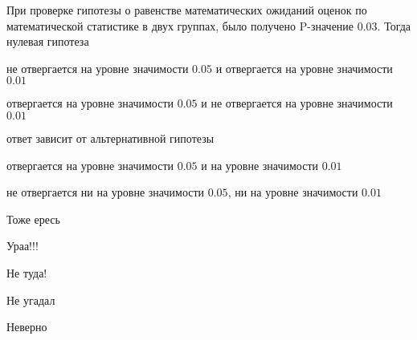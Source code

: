 
\begin{question}
При проверке гипотезы о равенстве математических ожиданий оценок по
математической статистике в двух группах, было получено P-значение 0.03.
Тогда нулевая гипотеза
\begin{answerlist}
  \item не отвергается на уровне значимости \(0.05\) и отвергается на уровне
значимости \(0.01\)
  \item отвергается на уровне значимости \(0.05\) и не отвергается на уровне
значимости \(0.01\)
  \item ответ зависит от альтернативной гипотезы
  \item отвергается на уровне значимости \(0.05\) и на уровне значимости
\(0.01\)
  \item не отвергается ни на уровне значимости \(0.05\), ни на уровне значимости
\(0.01\)
\end{answerlist}
\end{question}

\begin{solution}
\begin{answerlist}
  \item Тоже ересь
  \item Ураа!!!
  \item Не туда!
  \item Не угадал
  \item Неверно
\end{answerlist}
\end{solution}

